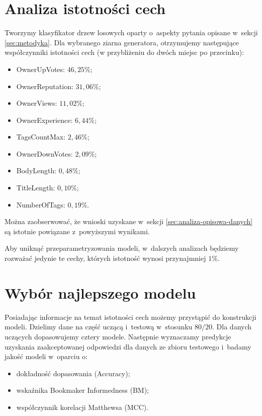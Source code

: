 \documentclass[12pt]{article}
\begin{document}
	\section{Analiza istotności cech}\label{sec:analiza-istotnosci-cech}
	Tworzymy klasyfikator drzew losowych oparty o~aspekty pytania opisane w~sekcji \ref{sec:metodyka}. Dla wybranego ziarna generatora, otrzymujemy następujące współczynniki istotności cech (w przybliżeniu do dwóch miejsc po przecinku):
	\begin{itemize}
		\item OwnerUpVotes: $46,25\%$;
		\item OwnerReputation: $31,06\%$;
		\item OwnerViews: $11,02\%$;
		\item OwnerExperience: $6,44\%$;
		\item TagsCountMax: $2,46\%$;
		\item OwnerDownVotes: $2,09\%$;
		\item BodyLength: $0,48\%$;
		\item TitleLength: $0,10\%$;
		\item NumberOfTags: $0,19\%$.
	\end{itemize}
	Można zaobserwować, że wnioski uzyskane w~sekcji \ref{sec:analiza-opisowa-danych} są istotnie powiązane z~powyższymi wynikami.
	
	\vspace{0.25cm}
	
	Aby uniknąć przeparametryzowania modeli, w~dalszych analizach będziemy rozważać jedynie te cechy, których istotność wynosi przynajmniej $1\%$.
	
	\section{Wybór najlepszego modelu}\label{sec:wybor-najlepszego-modelu}
	Posiadając informacje na temat istotności cech możemy przystąpić do konstrukcji modeli. Dzielimy dane na część uczącą i~testową w~stosunku $80/20$. Dla danych uczących dopasowujemy cztery modele. Następnie wyznaczamy predykcje uzyskania zaakceptowanej odpowiedzi dla danych ze zbioru testowego i~badamy jakość modeli w~oparciu o: 
	\begin{itemize}
		\item dokładność dopasowania (Accuracy); 
		\item wskaźnika Bookmaker Informedness (BM);
		\item współczynnik korelacji Matthewsa (MCC). 
	\end{itemize}
\end{document}
